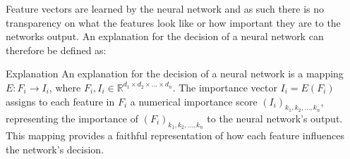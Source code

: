 Feature vectors are learned by the neural network and as such there is no transparency on what the features look like or how important they are to the networks output. An explanation for the decision of a neural network can therefore be defined as:

\begin{Definition}{Explanation}{}
An explanation for the decision of a neural network is a mapping \( E: F_i \rightarrow I_i \), where \( F_i, I_i \in \mathbb{R}^{d_1 \times d_2 \times \ldots \times d_n} \). The importance vector \( I_i = E(F_i) \) assigns to each feature in \( F_i \) a numerical importance score \( (I_i)_{k_1, k_2, \ldots, k_n} \), representing the importance of \( (F_i)_{k_1, k_2, \ldots, k_n} \) to the neural network's output. This mapping provides a faithful representation of how each feature influences the network's decision.
\end{Definition}


